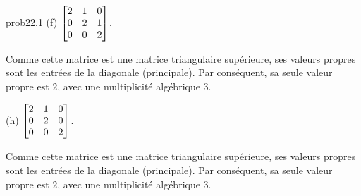 \begin{sol}{prob22.1}
(f) $\bmatrix 
2&1&0\\0&2&1\\0&0&2 \endbmatrix $.

\soln Comme cette matrice est une matrice triangulaire supérieure, ses valeurs propres sont les entrées de la diagonale (principale). Par conséquent, sa seule valeur propre est $2$, avec une multiplicité algébrique $3$.
\medskip

(h) $\bmatrix 
2&1&0\\0&2&0\\0&0&2 \endbmatrix$.

\soln Comme cette matrice est une matrice triangulaire supérieure, ses valeurs propres sont les entrées de la diagonale (principale). Par conséquent, sa seule valeur propre est $2$, avec une multiplicité algébrique $3$.
\medskip


\end{sol}

